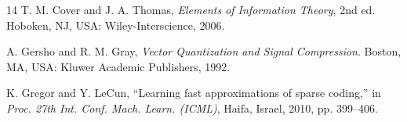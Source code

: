 \documentclass[conference]{IEEEtran}
\begin{document}
\begin{thebibliography}{14}
T. M. Cover and J. A. Thomas, \emph{Elements of Information Theory}, 2nd ed. Hoboken, NJ, USA: Wiley-Interscience, 2006.

A. Gersho and R. M. Gray, \emph{Vector Quantization and Signal Compression}. Boston, MA, USA: Kluwer Academic Publishers, 1992.

K. Gregor and Y. LeCun, ``Learning fast approximations of sparse coding,'' in \emph{Proc. 27th Int. Conf. Mach. Learn. (ICML)}, Haifa, Israel, 2010, pp. 399--406.

\end{thebibliography}
\end{document}

